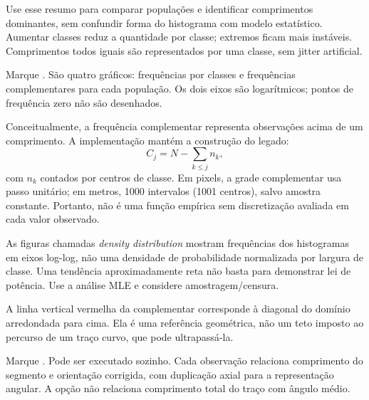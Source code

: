 Use esse resumo para comparar populações e identificar comprimentos dominantes, sem confundir forma do histograma com modelo estatístico. Aumentar classes reduz a quantidade por classe; extremos ficam mais instáveis. Comprimentos todos iguais são representados por uma classe, sem jitter artificial.

Marque . São quatro gráficos: frequências por classes e frequências complementares para cada população. Os dois eixos são logarítmicos; pontos de frequência zero não são desenhados.

Conceitualmente, a frequência complementar representa observações acima de um comprimento. A implementação mantém a construção do legado:
\begin{equation}
C_j=N-\sum_{k\leq j} n_k,
\end{equation}
com \(n_k\) contados por centros de classe. Em pixels, a grade complementar usa passo unitário; em metros, 1000 intervalos (1001 centros), salvo amostra constante. Portanto, não é uma função empírica sem discretização avaliada em cada valor observado.

As figuras chamadas \emph{density distribution} mostram frequências dos histogramas em eixos log-log, não uma densidade de probabilidade normalizada por largura de classe. Uma tendência aproximadamente reta não basta para demonstrar lei de potência. Use a análise MLE e considere amostragem/censura.

A linha vertical vermelha da complementar corresponde à diagonal do domínio arredondada para cima. Ela é uma referência geométrica, não um teto imposto ao percurso de um traço curvo, que pode ultrapassá-la.

Marque . Pode ser executado sozinho. Cada observação relaciona comprimento do segmento e orientação corrigida, com duplicação axial para a representação angular. A opção não relaciona comprimento total do traço com ângulo médio.

